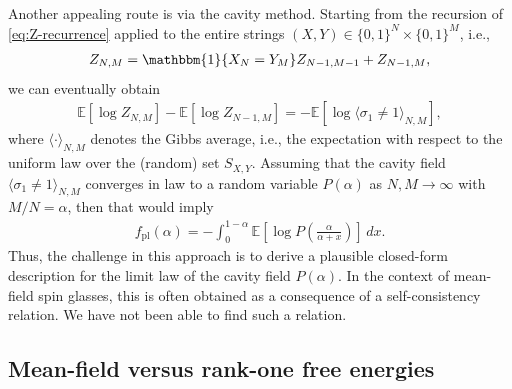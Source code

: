 \documentclass[11pt]{amsart}
\numberwithin{equation}{section}
\numberwithin{equation}{section}
\newcommand{\1}{\mathbbm{1}}
\newcommand{\E}{\mathbb{E}}
\theoremstyle{definition}
\begin{document}
 Another appealing route is via the cavity method. Starting from the recursion of \eqref{eq:Z-recurrence} applied to the entire strings $(X,Y) \in \{0,1\}^N \times \{0,1\}^M$, i.e., 
\begin{align*}
    Z_{N,M} = \1\{X_N=Y_M\} Z_{N-1,M-1}+Z_{N-1,M},
\end{align*}
we can eventually obtain
\begin{align*}
    \E\left[\log Z_{N,M} \right] - \E \left[ \log Z_{N-1,M} \right] = -\E\left[ \log \langle \sigma_1 \neq 1 \rangle_{N,M} \right],
\end{align*}
where $\langle \cdot \rangle_{N,M}$ denotes the Gibbs average, i.e., the expectation with respect to the uniform law over the (random) set $S_{X,Y}$. Assuming that the cavity field $\langle \sigma_1 \neq 1 \rangle_{N,M}$ converges in law to a random variable $P(\alpha)$ as $N,M\to\infty$ with $M/N = \alpha$, then that would imply
\begin{align*}
    f_{\mathrm{pl}}(\alpha) = -\int_0^{1-\alpha} \E \left[ \log P\!\left(\frac{\alpha}{\alpha+x}\right) \right] \,dx.
\end{align*}
Thus, the challenge in this approach is to derive a plausible closed-form description for the limit law of the cavity field $P(\alpha)$. In the context of mean-field spin glasses, this is often obtained as a consequence of a self-consistency relation. We have not been able to find such a relation.




\subsection{Mean-field versus rank-one free energies}
\end{document}
